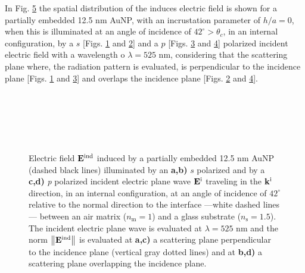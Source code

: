 In Fig. \ref{fig:Near:Inc0:42} the spatial distribution of the induces electric field is shown for a partially embedded 12.5 nm AuNP, with an incrustation parameter of $h/a = 0$, when this is illuminated at an angle of incidence of $42^\circ>\theta_c$, in an internal configuration, by a $s$ [Figs. \ref{sfig:Near:Inc0:42:s1} and \ref{sfig:Near:Inc0:42:s2}] and a $p$ [Figs. \ref{sfig:Near:Inc0:42:p1} and \ref{sfig:Near:Inc0:42:p2}] polarized incident electric field with a wavelength o $\lambda  =525$ nm, considering that the scattering plane where, the radiation pattern is evaluated, is perpendicular to the incidence plane [Figs. \ref{sfig:Near:Inc0:42:s1} and \ref{sfig:Near:Inc0:42:p1}] and overlaps the incidence plane [Figs. \ref{sfig:Near:Inc0:42:s2} and \ref{sfig:Near:Inc0:42:p2}].


\begin{figure}[h!]\centering
   \def\svgwidth{.75\textwidth}
   \footnotesize
   \\[-32.6em]
   \hspace*{-.25\textwidth}
       \begin{subfigure}{.25\textwidth}\textcolor{red}{\caption{ } \label{sfig:Near:Inc0:42:s1}}\end{subfigure}%
       \begin{subfigure}{.34\textwidth}\caption{ }\label{sfig:Near:Inc0:42:s2}\end{subfigure}\\[13em]
    \hspace*{-.25\textwidth}
       \begin{subfigure}{.25\textwidth}\textcolor{red}{\caption{ } \label{sfig:Near:Inc0:42:p1}}\end{subfigure}%
       \begin{subfigure}{.34\textwidth}\caption{ }\label{sfig:Near:Inc0:42:p2}\end{subfigure}\\[15em]
   \caption[Induced Electric Field of a 12.5 nm Au NP on substrate illuminated at oblique incidence with a $s$ polarized electric field]{%
   Electric field $\vb{E}^\text{ind}$ induced by a partially embedded 12.5 nm AuNP (dashed black lines) illuminated by an \textbf{a,b)} $s$ polarized and  by a \textbf{c,d)} \textit{p} polarized incident electric plane wave $\vb{E}^\text{i}$ traveling in the $\vb{k}^\text{i}$ direction, in an internal configuration, at an angle of incidence of  $42^\circ$ relative to the normal direction to the interface ---white dashed lines--- between an air matrix ($n_\text{m} = 1$) and a glass substrate ($n_\text{s} = 1.5$). The incident electric plane wave is evaluated at $\lambda = 525$ nm and the norm $\norm{\vb{E}^\text{ind}}$ is evaluated at  \textbf{a,c)} a scattering plane perpendicular to the incidence plane (vertical gray dotted lines) and at \textbf{b,d)} a scattering plane overlapping the incidence plane. }
   \label{fig:Near:Inc0:42}
 \end{figure}
